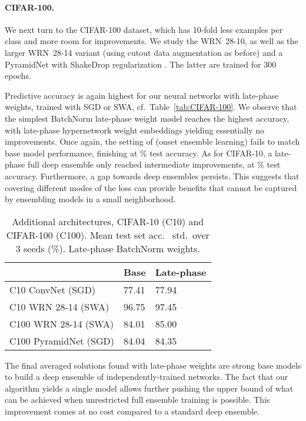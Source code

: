 \documentclass{article} \usepackage{iclr2021_conference,times}
\begin{document}
\paragraph{CIFAR-100.} We next turn to the CIFAR-100 dataset, which has 10-fold less examples per class and more room for improvements. We study the WRN~28-10, as well as the larger WRN~28-14 variant (using cutout data augmentation as before) and a PyramidNet \citep{han_deep_2017} with ShakeDrop regularization \citep{yamada_shakedrop_2019}. The latter are trained for 300 epochs.



Predictive accuracy is again highest for our neural networks with late-phase weights, trained with SGD or SWA, cf.~Table~\ref{tab:CIFAR-100}. We observe that the simplest BatchNorm late-phase weight model reaches the highest accuracy, with late-phase hypernetwork weight embeddings yielding essentially no improvements. Once again, the setting of  (onset ensemble learning) fails to match base model performance, finishing at
\% test accuracy. As for CIFAR-10, a late-phase full deep ensemble only reached intermediate improvements, at \% test accuracy. Furthermore, a gap towards deep ensembles persists. This suggests that covering different modes of the loss \citep{fort_deep_2020} can provide benefits that cannot be captured by ensembling models in a small neighborhood.

\setlength\intextsep{0pt}
\begin{wraptable}[10]{R}{0.57\textwidth}
  \caption{Additional architectures, CIFAR-10 (C10) and CIFAR-100 (C100). Mean test set acc.~ std.~over 3 seeds (\%). Late-phase BatchNorm weights.}
  \label{tab:CIFAR-other-arch}
 \vspace{-0.2cm}
\begin{tabular}{lll}
\toprule
           & Base & Late-phase \\\midrule
C10 ConvNet (SGD)      & 77.41   &  77.94      \\
C10 WRN 28-14 (SWA)  &     96.75     &  97.45 \\
C100 WRN 28-14 (SWA)  &     84.01     &  85.00 \\
C100 PyramidNet (SGD) &     84.04     &  84.35 \\
\bottomrule
\end{tabular}
\end{wraptable}
The final averaged solutions found with late-phase weights are strong base models to build a deep ensemble of independently-trained networks. The fact that our algorithm yields a single model allows further pushing the upper bound of what can be achieved when unrestricted full ensemble training is possible. This improvement comes at no cost compared to a standard deep ensemble.
\end{document}
